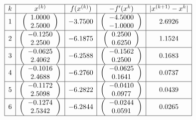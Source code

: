 \documentclass[14pt,a4paper]{extarticle}
\theoremstyle{definition}
\renewcommand{\[}{\begin{dmath*}[compact]}
\renewcommand{\]}{\end{dmath*}}
\begin{document}
\[\begin{array}{*5{|c}|}\hline
   k & x^{(k)} & f(x^{(k)}) & -f'(x^{k}) & \vert x^{(k+1)} - x^{k}\vert \\\hline   1 & \left(\begin{array}{c}    1.0000\\    2.5000\end{array}\right) &    -3.7500 & \left(\begin{array}{c}   -4.5000\\   -1.0000\end{array}\right) &     2.6926 \\\hline
   2 & \left(\begin{array}{c}   -0.1250\\    2.2500\end{array}\right) &    -6.1875 & \left(\begin{array}{c}    0.2500\\    0.6250\end{array}\right) &     1.1524 \\\hline
   3 & \left(\begin{array}{c}   -0.0625\\    2.4062\end{array}\right) &    -6.2588 & \left(\begin{array}{c}   -0.1562\\    0.2500\end{array}\right) &     0.1683 \\\hline
   4 & \left(\begin{array}{c}   -0.1016\\    2.4688\end{array}\right) &    -6.2760 & \left(\begin{array}{c}   -0.0625\\    0.1641\end{array}\right) &     0.0737 \\\hline
   5 & \left(\begin{array}{c}   -0.1172\\    2.5098\end{array}\right) &    -6.2822 & \left(\begin{array}{c}   -0.0410\\    0.0977\end{array}\right) &     0.0439 \\\hline
   6 & \left(\begin{array}{c}   -0.1274\\    2.5342\end{array}\right) &    -6.2844 & \left(\begin{array}{c}   -0.0244\\    0.0591\end{array}\right) &     0.0265 \\\hline

\end{array}\]
\end{document}
